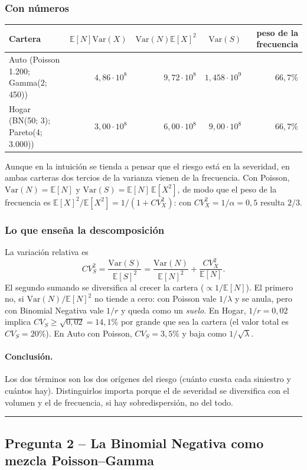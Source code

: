 \documentclass[a4paper,12pt]{article}
\newcommand{\E}{\mathbb{E}}
\newcommand{\Var}{\mathrm{Var}}
\begin{document}
\subsubsection*{Con n\'umeros}
\begin{center}
\begin{tabular}{lrrrr}
\toprule
Cartera & $\E[N]\Var(X)$ & $\Var(N)\E[X]^2$ & $\Var(S)$ & peso de la frecuencia\\
\midrule
Auto (Poisson 1.200; Gamma(2; 450)) & $4{,}86\cdot10^{8}$ & $9{,}72\cdot10^{8}$ & $1{,}458\cdot10^{9}$ & $66{,}7\%$\\
Hogar (BN(50; 3); Pareto(4; 3.000)) & $3{,}00\cdot10^{8}$ & $6{,}00\cdot10^{8}$ & $9{,}00\cdot10^{8}$ & $66{,}7\%$\\
\bottomrule
\end{tabular}
\end{center}
Aunque en la intuici\'on se tienda a pensar que el riesgo est\'a en la severidad, en ambas carteras dos tercios de la varianza vienen de la frecuencia. Con Poisson, $\Var(N)=\E[N]$ y $\Var(S)=\E[N]\,\E[X^2]$, de modo que el peso de la frecuencia es $\E[X]^2/\E[X^2]=1/(1+CV_X^2)$: con $CV_X^2=1/\alpha=0{,}5$ resulta $2/3$.

\subsubsection*{Lo que ense\~na la descomposici\'on}
La variaci\'on relativa es
\[
CV_S^2=\frac{\Var(S)}{\E[S]^2}=\frac{\Var(N)}{\E[N]^2}+\frac{CV_X^2}{\E[N]} .
\]
El segundo sumando se diversifica al crecer la cartera ($\propto1/\E[N]$). El primero no, si $\Var(N)/\E[N]^2$ no tiende a cero: con Poisson vale $1/\lambda$ y se anula, pero con Binomial Negativa vale $1/r$ y queda como un \emph{suelo}. En Hogar, $1/r=0{,}02$ implica $CV_S\ge\sqrt{0{,}02}=14{,}1\%$ por grande que sea la cartera (el valor total es $CV_S=20\%$). En Auto con Poisson, $CV_S=3{,}5\%$ y baja como $1/\sqrt\lambda$.

\paragraph{Conclusi\'on.} Los dos t\'erminos son los dos or\'igenes del riesgo (cu\'anto cuesta cada siniestro y cu\'antos hay). Distinguirlos importa porque el de severidad se diversifica con el volumen y el de frecuencia, si hay sobredispersi\'on, no del todo.

\bigskip\hrule\bigskip

\subsection{Pregunta 2 -- La Binomial Negativa como mezcla Poisson--Gamma}
\end{document}
